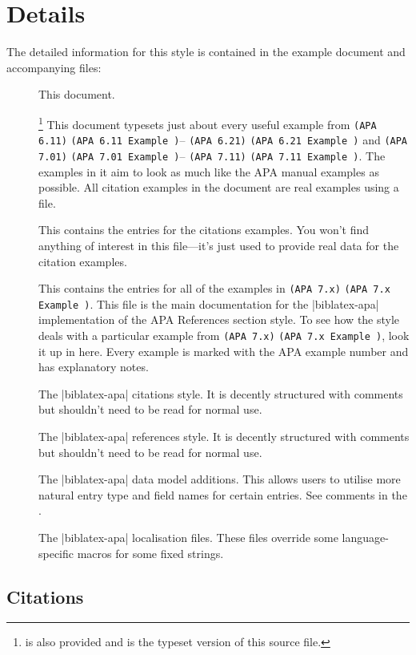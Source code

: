 \documentclass{ltxdockit}
\newcommand\apa[2][]{\ifthenelse{\equal{#1}{}}%
                       {\texttt{(APA #2)}}%
                       {\texttt{(APA #2 Example #1)}}}
\begin{document}
\section{Details}

The detailed information for this style is contained in the example document and
accompanying  files:
\begin{description}
\item[] This document.
\item[]\footnote{
    is also provided and is the typeset version of this \latex source
    file.} This document typesets just about every useful example from
  \apa{6.11}--\apa{6.21} and \apa{7.01}--\apa{7.11}. The examples in it
  aim to look as much like the APA manual examples as possible. All
  citation examples in the document are real examples using a 
  file.
\item[] This contains the 
  entries for the citations examples. You won't find anything of interest
  in this file---it's just used to provide real data for the citation
  examples.
\item[] This contains the
   entries for all of the examples in \apa{7.x}. This file is
  the main documentation for the |biblatex-apa| implementation of the APA
  References section style. To see how the style deals with a particular
  example from \apa{7.x}, look it up in here. Every example is marked with
  the APA example number and has explanatory notes.
\item[] The |biblatex-apa| citations style. It is
  decently structured with comments but shouldn't need to be read for
  normal use.
\item[] The |biblatex-apa| references style. It is
  decently structured with comments but shouldn't need to be read for
  normal use.
\item[] The |biblatex-apa| data model additions. This allows
  users to utilise more natural entry type and field names for certain
  entries. See comments in the .
\item[] The |biblatex-apa| localisation files. These files
  override some language-specific macros for some fixed strings.
\end{description}

\subsection{Citations}
\end{document}
